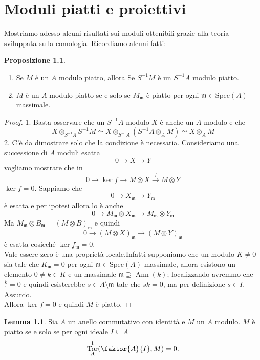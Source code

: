 \documentclass[a4paper,11pt,oneside]{book}
\newcommand{\Spec}{\mathrm{Spec}}
\newcommand{\inverti}[1]{{#1}^{-1}}
\newcommand{\m}{\mathfrak{m}}
\DeclareMathOperator{\Tor}{Tor}
\DeclareMathOperator{\Ann}{Ann}
\theoremstyle{definition}
\newtheorem{prop}{Proposizione}
\newtheorem{lemma}{Lemma}
\begin{document}
 \chapter{Moduli piatti e proiettivi}
    Mostriamo adesso alcuni risultati sui moduli ottenibili grazie alla teoria sviluppata sulla comologia.
   Ricordiamo alcuni fatti:
   \begin{prop}\*
    \begin{enumerate}
     \item Se $M$ è un $A$ modulo piatto, allora Se $\inverti S M$ è un $\inverti S A$ modulo piatto.
     \item $M$ è un $A$ modulo piatto se e solo se $M_{\m}$ è piatto per ogni $\m\in \Spec(A)$  massimale.
    \end{enumerate}
   \end{prop}
   
   \begin{proof}
   1. Basta osservare che un $\inverti S A$ modulo $X$ è anche un $A$ modulo e che 
   \[ X \otimes_{\inverti S A}\inverti S M\simeq  X \otimes_{\inverti S A} (\inverti S A \otimes_A M)\simeq
      X \otimes_A M\]
   2. C'è da dimostrare solo che la condizione è necessaria. Consideriamo una successione di $A$ moduli esatta
   \[
    0\rightarrow X\rightarrow Y
   \]
    vogliamo mostrare che in 
    \[
    0\rightarrow \ker f \rightarrow M \otimes X\xrightarrow{f} M\otimes Y
   \]
   $\ker f=0$. Sappiamo che
   \[
    0\rightarrow X_{\m}\rightarrow Y_{\m}
   \]
   è esatta e per ipotesi allora lo è anche 
   \[
    0\rightarrow M_{\m}\otimes X_{\m}\rightarrow M_{\m}\otimes Y_{\m}
   \]
   Ma $M_{\m}\otimes B_{\m}=(M\otimes B)_{\m}$ e quindi
    \[
    0\rightarrow (M\otimes X)_{\m}\rightarrow (M\otimes Y)_{\m}
   \]
   è esatta cosicché $\ker f_{\m}=0$.\\
   Vale essere zero è una proprietà locale.Infatti 
   supponiamo che un modulo $K\neq0$ sia tale che $K_{\m}=0$ per ogni $\m\in \Spec(A)$  massimale, 
   allora esistono un elemento $0\neq k\in K$ e un massimale $\m\supseteq\Ann(k)$; localizzando 
   avremmo che $\frac{k}{1}=0$ e quindi esisterebbe $s\in A\setminus \m$ tale che $sk=0$, ma
   per definizione $s\in I$. Assurdo.\\
   Allora $\ker f=0$ e quindi $M$ è piatto.
   \end{proof}


   
   \begin{lemma}\label{lemma:torquozienti}
    Sia $A$ un anello commutativo con identità e $M$ un $A$ modulo. 
    $M$ è piatto se e solo se per ogni ideale $I\subseteq A$ $$\Tor_A^1 ( \faktor{A}{I}, M )=0.$$
    \end{lemma}
\end{document}
